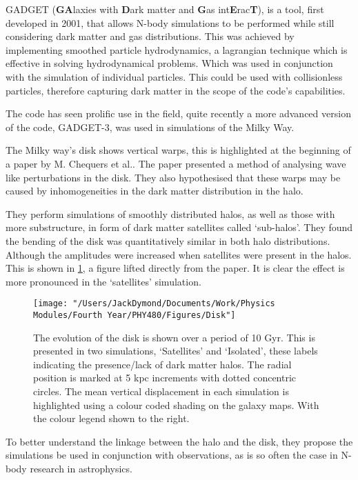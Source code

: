 \documentclass[a4paper,10pt]{article}
\begin{document}
GADGET (\textbf{GA}laxies with \textbf{D}ark matter and \textbf{G}as int\textbf{E}rac\textbf{T}), is a tool, first developed in 2001\cite{Gadget}, that allows N-body simulations to be performed while still considering dark matter and gas distributions. This was achieved by implementing smoothed particle hydrodynamics, a lagrangian technique which is effective in solving hydrodynamical problems. Which was used in conjunction with the simulation of individual particles. This could be used with collisionless particles, therefore capturing dark matter in the scope of the code's capabilities. 

The code has seen prolific use in the field, quite recently a more advanced version of the code, GADGET-3, was used in simulations of the Milky Way. 

The Milky way's disk shows vertical warps, this is highlighted at the beginning of a paper by M. Chequers et al.\cite{Bendy}. The paper presented a method of analysing wave like perturbations in the disk. They also hypothesised that these warps may be caused by inhomogeneities in the dark matter distribution in the halo. 

They perform simulations of smoothly distributed halos, as well as those with more substructure, in form of dark matter satellites called `sub-halos'. They found the bending of the disk was quantitatively similar in both halo distributions. Although the amplitudes were increased when satellites were present in the halos. This is shown in \cref{Disk}, a figure lifted directly from the paper. It is clear the effect is more pronounced in the `satellites' simulation.

\begin{figure}[h!]
\centering
\texttt{[image: "/Users/JackDymond/Documents/Work/Physics Modules/Fourth Year/PHY480/Figures/Disk"]}
\caption{The evolution of the disk is shown over a period of 10 Gyr. This is presented in two simulations, `Satellites' and `Isolated', these labels indicating the presence/lack of dark matter halos. The radial position is marked at 5 kpc increments with dotted concentric circles. The mean vertical displacement in each simulation is highlighted using a colour coded shading on the galaxy maps. With the colour legend shown to the right.}
\label{Disk}
\end{figure}

To better understand the linkage between the halo and the disk, they propose the simulations be used in conjunction with observations, as is so often the case in N-body research in astrophysics.
\end{document}
